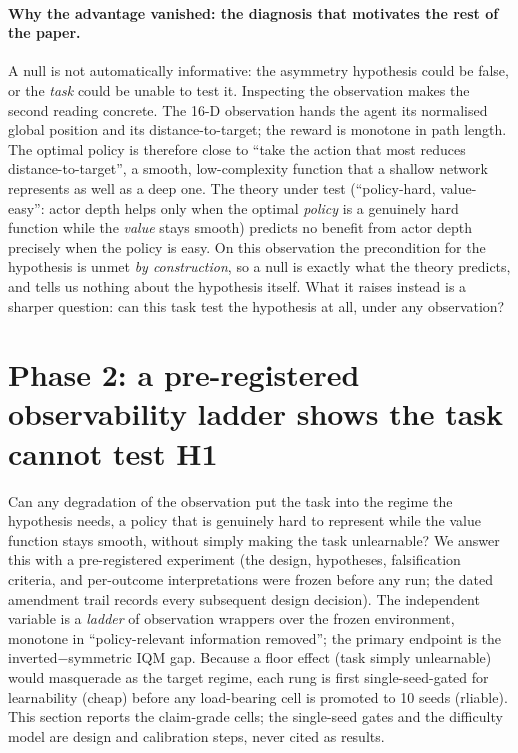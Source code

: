 \documentclass[10pt]{article}
\begin{document}
\paragraph{Why the advantage vanished: the diagnosis that motivates the rest of the paper.}
A null is not automatically informative: the asymmetry hypothesis could be false, or the
\emph{task} could be unable to test it. Inspecting the observation makes the second reading
concrete. The 16-D observation hands the agent its normalised global position and its
distance-to-target; the reward is monotone in path length. The optimal policy is therefore
close to ``take the action that most reduces distance-to-target'', a smooth, low-complexity
function that a shallow network represents as well as a deep one. The theory under test
(``policy-hard, value-easy'': actor depth helps only when the optimal \emph{policy} is a
genuinely hard function while the \emph{value} stays smooth) predicts no benefit
from actor depth precisely when the policy is easy. On this observation the precondition for
the hypothesis is unmet \emph{by construction}, so a null is exactly what the theory
predicts, and tells us nothing about the hypothesis itself. What it raises instead is a
sharper question: can this task test the hypothesis at all, under any observation?

\section{Phase 2: a pre-registered observability ladder shows the task cannot test H1}
\label{sec:phase2}

Can any degradation of the observation put the task into the regime the hypothesis
needs, a policy that is genuinely hard to represent while the value function stays smooth,
without simply making the task unlearnable? We answer this with a pre-registered
experiment (the design, hypotheses, falsification criteria, and per-outcome interpretations
were frozen before any run; the dated amendment trail records every subsequent design
decision). The independent variable is a \emph{ladder} of observation wrappers over the
frozen environment, monotone in ``policy-relevant information removed''; the primary
endpoint is the inverted$-$symmetric IQM gap. Because a floor effect (task simply
unlearnable) would masquerade as the target regime, each rung is first
single-seed-gated for learnability (cheap) before any load-bearing cell is promoted
to 10 seeds (rliable). This section reports the claim-grade cells; the single-seed gates and
the difficulty model are design and calibration steps, never cited as results.
\end{document}
